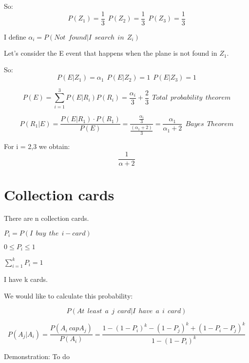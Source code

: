 \documentclass{article}
\begin{document}
\bigskip

So: $$P(Z_1) = \frac{1}{3} \ \ P(Z_2) = \frac{1}{3} \ \ P(Z_3) = \frac{1}{3}$$

\bigskip

I define $\alpha_i = P(Not \ \ found| I \ \ search \ \ in \ \ Z_i)$

\bigskip

Let's consider the E event that happens when the plane is not found in $Z_1$.

\bigskip

So: $$ P(E|Z_1) = \alpha_1 \ \ P(E|Z_2) = 1 \ \ P(E|Z_3) = 1$$ 


$$P(E) = \sum_{i=1}^3 P(E|R_i)P(R_i) = \frac{\alpha_i}{3} + \frac{2}{3} \ \ Total \ \ probability \ \ theorem$$

$$P(R_1|E) = \frac{P(E| R_1) \cdot P(R_1)}{P(E)} =  \frac{\frac{\alpha_i}{3}}{\frac{(\alpha_1 + 2)}{3}} = \frac{\alpha_1}{\alpha_1 + 2} \ \ Bayes \ \ Theorem$$

For i = 2,3 we obtain: $$\frac{1}{\alpha + 2}$$ 

\section{Collection cards}

There are n collection cards. 

$P_i = P(I \ \ buy \ \ the \ \ i-card)$

\bigskip

$0 \leq P_i \leq 1$

\bigskip

$\sum_{i=1}^k P_i = 1$

\bigskip

I have k cards.

We would like to calculate this probability:

$$P(At \ \ least \ \ a \ \ j \ \ card | I \ \ have \ \ a \ \ i \ \ card)$$

$$P(A_j | A_i ) = \frac{P(A_i \ cap A_j)}{P(A_i)} = \frac{1 - (1 - P_i)^k - (1 - P_j)^k + (1 - P_i - P_j)^k}{1 - (1 - P_i)^k}$$

Demonstration: To do
\end{document}
